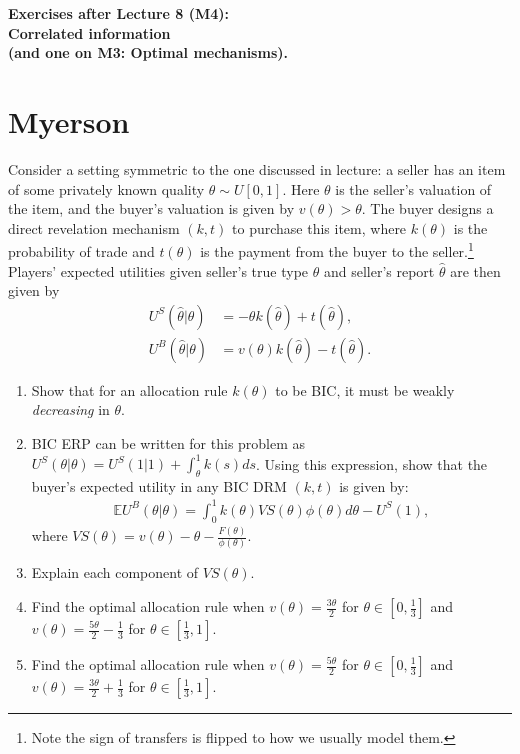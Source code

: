 \documentclass[a4paper]{article}
\begin{document}
\begin{center}
		\LARGE\textbf{Exercises after Lecture 8 (M4):\\ Correlated information \\ (and one on M3: Optimal mechanisms).}
\end{center}



\section{Myerson}
	Consider a setting symmetric to the one discussed in lecture: a seller has an item of some privately known quality $\theta \sim U[0,1]$. Here $\theta$ is the seller's valuation of the item, and the buyer's valuation is given by $v(\theta) > \theta$. The buyer designs a direct revelation mechanism $(k,t)$ to purchase this item, where $k(\theta)$ is the probability of trade and $t(\theta)$ is the payment from the buyer to the seller.\footnote{Note the sign of transfers is flipped to how we usually model them.} Players' expected utilities given seller's true type $\theta$ and seller's report $\hat{\theta}$ are then given by
	\begin{align*}
		U^S(\hat{\theta}|\theta) &= -\theta k(\hat{\theta}) + t(\hat{\theta}),
		\\
		U^B(\hat{\theta}|\theta) &= v(\theta) k(\hat{\theta}) - t(\hat{\theta}).
	\end{align*}
	\begin{enumerate}
		\item Show that for an allocation rule $k(\theta)$ to be BIC, it must be weakly \emph{decreasing} in $\theta$.
		\item BIC ERP can be written for this problem as $U^S(\theta|\theta) = U^S(1|1) + \int_{\theta}^{1} k(s) ds $. Using this expression, show that the buyer's expected utility in any BIC DRM $(k,t)$ is given by:
		\begin{align*}
			\mathbb{E} U^B(\theta | \theta) = \int_0^1 k(\theta) VS(\theta) \phi(\theta) d\theta - U^S(1),
		\end{align*}
		where $VS(\theta) = v(\theta) - \theta - \frac{F(\theta)}{\phi(\theta)}$.
		\item Explain each component of $VS(\theta)$.
		\item Find the optimal allocation rule when $v(\theta) = \frac{3\theta}{2}$ for $\theta \in [0,\frac{1}{3}]$ and $v(\theta) = \frac{5\theta}{2}-\frac{1}{3}$ for $\theta \in [\frac{1}{3},1]$.
		\item Find the optimal allocation rule when $v(\theta) = \frac{5\theta}{2}$ for $\theta \in [0,\frac{1}{3}]$ and $v(\theta) = \frac{3\theta}{2}+\frac{1}{3}$ for $\theta \in [\frac{1}{3},1]$.
	\end{enumerate}
		
\end{document}
